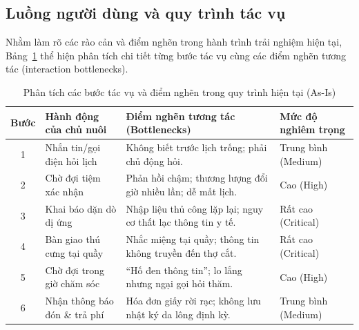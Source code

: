 \subsection{Luồng người dùng và quy trình tác vụ}
Nhằm làm rõ các rào cản và điểm nghẽn trong hành trình trải nghiệm hiện tại, Bảng~\ref{tab:as_is_workflow} thể hiện phân tích chi tiết từng bước tác vụ cùng các điểm nghẽn tương tác (interaction bottlenecks).

\begin{table}[H]
\centering
\small
\begin{tabularx}{\textwidth}{|c|l|X|l|}
\hline
\textbf{Bước} & \textbf{Hành động của chủ nuôi} & \textbf{Điểm nghẽn tương tác (Bottlenecks)} & \textbf{Mức độ nghiêm trọng} \\ \hline
1 & Nhắn tin/gọi điện hỏi lịch & Không biết trước lịch trống; phải chủ động hỏi. & Trung bình (Medium) \\ \hline
2 & Chờ đợi tiệm xác nhận & Phản hồi chậm; thương lượng đổi giờ nhiều lần; dễ mất lịch. & Cao (High) \\ \hline
3 & Khai báo dặn dò dị ứng & Nhập liệu thủ công lặp lại; nguy cơ thất lạc thông tin y tế. & Rất cao (Critical) \\ \hline
4 & Bàn giao thú cưng tại quầy & Nhắc miệng tại quầy; thông tin không truyền đến thợ cắt. & Rất cao (Critical) \\ \hline
5 & Chờ đợi trong giờ chăm sóc & ``Hố đen thông tin''; lo lắng nhưng ngại gọi hỏi thăm. & Cao (High) \\ \hline
6 & Nhận thông báo đón \& trả phí & Hóa đơn giấy rời rạc; không lưu nhật ký da lông định kỳ. & Trung bình (Medium) \\ \hline
\end{tabularx}
\caption{Phân tích các bước tác vụ và điểm nghẽn trong quy trình hiện tại (As-Is)}
\label{tab:as_is_workflow}
\end{table}

